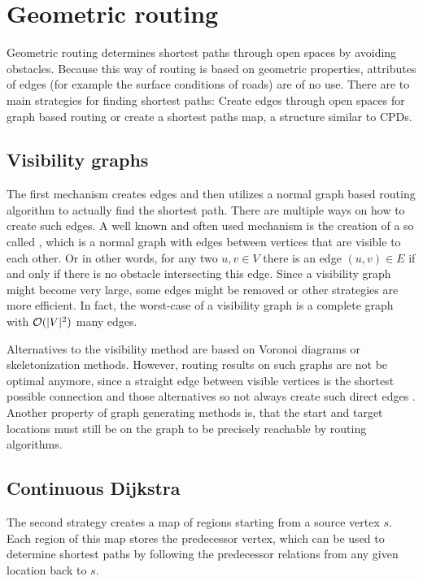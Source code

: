 \section{Geometric routing}
\label{sec:geometric-routing}

	Geometric routing determines shortest paths through open spaces by avoiding obstacles.
	Because this way of routing is based on geometric properties, attributes of edges (for example the surface conditions of roads) are of no use.
	There are to main strategies for finding shortest paths:
	Create edges through open spaces for graph based routing or create a shortest paths map, a structure similar to CPDs.
	
	\subsection{Visibility graphs}
	\label{subsec:visibility-graph}
	
		The first mechanism creates edges and then utilizes a normal graph based routing algorithm to actually find the shortest path.
		There are multiple ways on how to create such edges.
		A well known and often used mechanism is the creation of a so called , which is a normal graph with edges between vertices that are visible to each other.
		Or in other words, for any two $u, v \in V$ there is an edge $(u, v) \in E$ if and only if there is no obstacle intersecting this edge.
		Since a visibility graph might become very large, some edges might be removed or other strategies are more efficient.
		In fact, the worst-case of a visibility graph is a complete graph with $\mathcal{O}(|V|^2)$ many edges.
		
		Alternatives to the visibility method are based on Voronoi diagrams or skeletonization methods.
		However, routing results on such graphs are not be optimal anymore, since a straight edge between visible vertices is the shortest possible connection and those alternatives so not always create such direct edges \cite{graser-osm-open-spaces}.
		Another property of graph generating methods is, that the start and target locations must still be on the graph to be precisely reachable by routing algorithms.
	
	\subsection{Continuous Dijkstra}
	\label{subsec:continuous-dijkstra}
	
		The second strategy creates a map of regions starting from a source vertex $s$.
		Each region of this map stores the predecessor vertex, which can be used to determine shortest paths by following the predecessor relations from any given location back to $s$.

